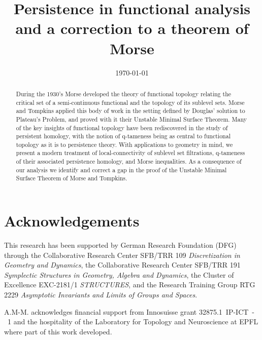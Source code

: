\documentclass{amsart}
\theoremstyle{plain}
\theoremstyle{definition}
\begin{document}
\title[Persistence in functional analysis]{Persistence in functional analysis and a correction to a theorem of Morse}

	
\date{\today}

\begin{abstract}
	During the 1930's Morse developed the theory of functional topology relating the critical set of a semi-continuous functional and the topology of its sublevel sets.
	Morse and Tompkins applied this body of work in the setting defined by Douglas' solution to Plateau's Problem, and proved with it their Unstable Minimal Surface Theorem.
	Many of the key insights of functional topology have been rediscovered in the study of persistent homology, with the notion of q-tameness being as central to functional topology as it is to persistence theory.
	With applications to geometry in mind, we present a modern treatment of local-connectivity of sublevel set filtrations, q-tameness of their associated persistence homology, and Morse inequalities.
	As a consequence of our analysis we identify and correct a gap in the proof of the Unstable Minimal Surface Theorem of Morse and Tompkins.
\end{abstract}

\maketitle
\tableofcontents





\appendix


\section*{Acknowledgements}
This research has been supported by German Research Foundation (DFG) through the Collaborative Research Center SFB/TRR 109 \emph{Discretization in Geometry and Dynamics}, the Collaborative Research Center SFB/TRR 191 \emph{Symplectic Structures in Geometry, Algebra and Dynamics}, the Cluster of Excellence EXC-2181/1 \emph{STRUCTURES}, and the Research Training Group RTG 2229 \emph{Asymptotic Invariants and Limits of Groups and Spaces}.

A.M-M. acknowledges financial support from Innosuisse grant \mbox{32875.1 IP-ICT - 1} and the hospitality of the Laboratory for Topology and Neuroscience at EPFL where part of this work developed.



\end{document}
